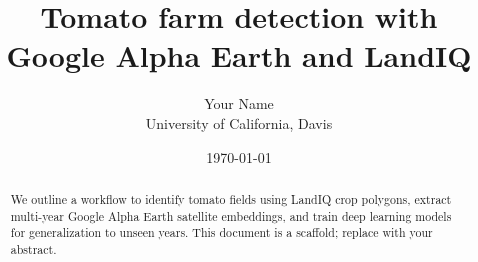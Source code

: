 \documentclass[11pt]{article}
\title{Tomato farm detection with Google Alpha Earth and LandIQ}
\author{Your Name \\ University of California, Davis}
\date{\today}
\begin{document}
\maketitle

\begin{abstract}
We outline a workflow to identify tomato fields using LandIQ crop polygons, extract multi-year Google Alpha Earth satellite embeddings, and train deep learning models for generalization to unseen years. This document is a scaffold; replace with your abstract.
\end{abstract}






\nocite{*}



\end{document}
